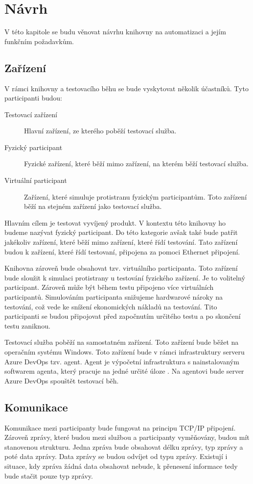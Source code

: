 \chapter{Návrh}

V této kapitole se budu věnovat návrhu knihovny na automatizaci a jejím funkčním požadavkům.

\section{Zařízení}
V rámci knihovny a testovacího běhu se bude vyskytovat několik účastníků. Tyto participanti budou:

\begin{description}
    \item[Testovací zařízení] Hlavní zařízení, ze kterého poběží testovací služba.
    \item[Fyzický participant] Fyzické zařízení, které běží mimo zařízení, na kterém běží testovací služba.
    \item[Virtuální participant] Zařízení, které simuluje protistranu fyzickým participantům. Toto zařízení běží na stejném zařízení jako testovací služba.
\end{description}

Hlavním cílem je testovat vyvíjený produkt. V kontextu této knihovny ho budeme nazývat fyzický participant. Do této kategorie avšak také bude patřit jakékoliv zařízení, které běží mimo zařízení, které řídí testování. Tato zařízení budou k zařízení, které řídí testovaní, připojena za pomoci Ethernet připojení.

Knihovna zároveň bude obsahovat tzv. virtuálního participanta. Toto zařízení bude sloužit k simulaci protistrany u testování fyzického zařízení. Je to volitelný participant. Zároveň může být během testu připojeno více virtuálních participantů. Simulováním participanta snižujeme hardwarové nároky na testování, což vede ke snížení ekonomických nákladů na testování. Tito participanti se budou připojovat před započnutím určitého testu a po skončení testu zaniknou.

Testovací služba poběží na samostatném zařízení. Toto zařízení bude běžet na operačním systému Windows. Toto zařízení bude v rámci infrastruktury serveru Azure DevOps tzv. agent. Agent je výpočetní infrastruktura s nainstalovaným softwarem agenta, který pracuje na jedné určité úloze \cite{agent_docs}. Na agentovi bude server Azure DevOps spouštět testovací běh.


\section{Komunikace}
Komunikace mezi participanty bude fungovat na principu TCP/IP připojení. Zároveň zprávy, které budou mezi službou a participanty vyměňovány, budou mít stanovenou strukturu. Jedna zpráva bude obsahovat délku zprávy, typ zprávy a poté data zprávy. Data zprávy se budou odvíjet od typu zprávy. Existují i situace, kdy zpráva žádná data obsahovat nebude, k přenesení informace tedy bude stačit pouze typ zprávy. 

